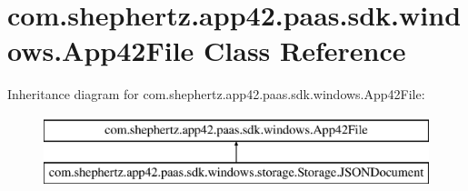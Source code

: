 \hypertarget{classcom_1_1shephertz_1_1app42_1_1paas_1_1sdk_1_1windows_1_1_app42_file}{\section{com.\+shephertz.\+app42.\+paas.\+sdk.\+windows.\+App42\+File Class Reference}
\label{classcom_1_1shephertz_1_1app42_1_1paas_1_1sdk_1_1windows_1_1_app42_file}
}
Inheritance diagram for com.\+shephertz.\+app42.\+paas.\+sdk.\+windows.\+App42\+File\+:\begin{figure}[H]
\begin{center}
\leavevmode
\includegraphics[height=2.000000cm]{classcom_1_1shephertz_1_1app42_1_1paas_1_1sdk_1_1windows_1_1_app42_file}
\end{center}
\end{figure}
